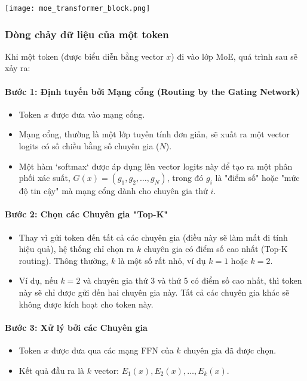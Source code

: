\begin{center}
    \texttt{[image: moe\_transformer\_block.png]}
    \label{fig:moe_transformer_block}
\end{center}

\subsubsection{Dòng chảy dữ liệu của một token}
Khi một token (được biểu diễn bằng vector $x$) đi vào lớp MoE, quá trình sau sẽ xảy ra:

\paragraph{Bước 1: Định tuyến bởi Mạng cổng (Routing by the Gating Network)}
\begin{itemize}
    \item Token $x$ được đưa vào mạng cổng.
    \item Mạng cổng, thường là một lớp tuyến tính đơn giản, sẽ xuất ra một vector logits có số chiều bằng số chuyên gia ($N$).
    \item Một hàm `softmax` được áp dụng lên vector logits này để tạo ra một phân phối xác suất, $G(x) = (g_1, g_2, \dots, g_N)$, trong đó $g_i$ là "điểm số" hoặc "mức độ tin cậy" mà mạng cổng dành cho chuyên gia thứ $i$.
\end{itemize}

\paragraph{Bước 2: Chọn các Chuyên gia "Top-K"}
\begin{itemize}
    \item Thay vì gửi token đến tất cả các chuyên gia (điều này sẽ làm mất đi tính hiệu quả), hệ thống chỉ chọn ra $k$ chuyên gia có điểm số cao nhất (Top-K routing). Thông thường, $k$ là một số rất nhỏ, ví dụ $k=1$ hoặc $k=2$.
    \item Ví dụ, nếu $k=2$ và chuyên gia thứ 3 và thứ 5 có điểm số cao nhất, thì token này sẽ chỉ được gửi đến hai chuyên gia này. Tất cả các chuyên gia khác sẽ không được kích hoạt cho token này.
\end{itemize}

\paragraph{Bước 3: Xử lý bởi các Chuyên gia}
\begin{itemize}
    \item Token $x$ được đưa qua các mạng FFN của $k$ chuyên gia đã được chọn.
    \item Kết quả đầu ra là $k$ vector: $E_1(x), E_2(x), \dots, E_k(x)$.
\end{itemize}

